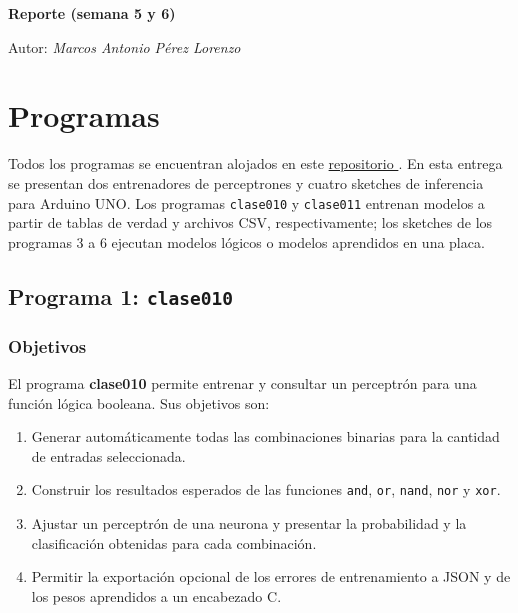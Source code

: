 \documentclass{article}[12pt,a4paper]
\begin{document}
\begin{titlepage}

  \centering
  {\huge\bfseries Reporte (semana 5 y 6)\par}
  {\Large Autor: \itshape Marcos Antonio Pérez Lorenzo\par}
\end{titlepage}

\pagebreak



\section{Programas}

Todos los programas se encuentran alojados en este
\href{https://github.com/MarcosHCK/master-programming/}{repositorio \faGithubSquare}.
En esta entrega se presentan dos entrenadores de perceptrones y cuatro sketches
de inferencia para Arduino UNO. Los programas \texttt{clase010} y
\texttt{clase011} entrenan modelos a partir de tablas de verdad y archivos CSV,
respectivamente; los sketches de los programas 3 a 6 ejecutan modelos lógicos o
modelos aprendidos en una placa.

\subsection{Programa 1: \texttt{clase010}}

\subsubsection{Objetivos}

El programa \textbf{clase010} permite entrenar y consultar un perceptrón para
una función lógica booleana. Sus objetivos son:

\begin{enumerate}
  \item Generar automáticamente todas las combinaciones binarias para la
    cantidad de entradas seleccionada.
  \item Construir los resultados esperados de las funciones \texttt{and},
    \texttt{or}, \texttt{nand}, \texttt{nor} y \texttt{xor}.
  \item Ajustar un perceptrón de una neurona y presentar la probabilidad y la
    clasificación obtenidas para cada combinación.
  \item Permitir la exportación opcional de los errores de entrenamiento a
    JSON y de los pesos aprendidos a un encabezado C.
\end{enumerate}
\end{document}
